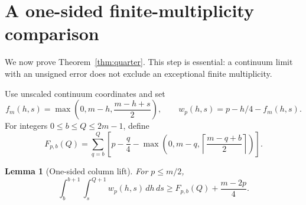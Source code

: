 \documentclass[11pt]{article}
\newtheorem{lemma}[theorem]{Lemma}
\theoremstyle{remark}\newtheorem{remark}[theorem]{Remark}
\newcommand{\dd}{\,d}
\begin{document}
\section{A one-sided finite-multiplicity comparison}

We now prove Theorem~\ref{thm:quarter}. This step is essential: a continuum limit with an unsigned error does not exclude an exceptional finite multiplicity.

Use unscaled continuum coordinates and set
\[
 f_m(h,s)=\max\left(0,m-h,\frac{m-h+s}{2}\right),\qquad
 w_p(h,s)=p-h/4-f_m(h,s).
\]
For integers $0\le b\le Q\le2m-1$, define
\[
 F_{p,b}(Q)=\sum_{q=b}^{Q}
 \left[p-\frac q4-
 \max\left(0,m-q,\left\lceil\frac{m-q+b}{2}\right\rceil\right)\right].
\]
\begin{lemma}[One-sided column lift]\label{lem:finite-lift}
For $p\le m/2$,
\begin{equation}\label{eq:finite-lift}
 \int_b^{b+1}\int_s^{Q+1}w_p(h,s)\dd h\dd s
 \ge F_{p,b}(Q)+\frac{m-2p}{4}.
\end{equation}
\end{lemma}
\end{document}
